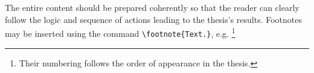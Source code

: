 The entire content should be prepared coherently so that the reader can clearly follow the logic and sequence of actions leading to the thesis's results. Footnotes may be inserted using the command \verb|\footnote{Text.}|, e.g. \footnote{Their numbering follows the order of appearance in the thesis.}
